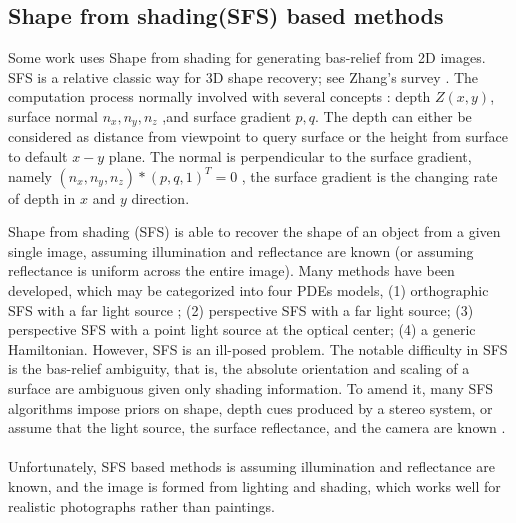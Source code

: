 \subsection{Shape from shading(SFS) based methods}
Some work uses Shape from shading for generating  bas-relief from 2D images. SFS is a relative classic way for 3D shape recovery; see Zhang's survey \cite{zhang1999shape}.  The computation process normally involved with several concepts : depth $Z(x,y)$, surface normal $n_x,n_y,n_z$ ,and surface gradient $p,q$. The depth can either be considered as distance from viewpoint to query surface or the height from surface to default $x-y$ plane. The normal is perpendicular to the surface gradient, namely $\left( n_x,n_y,n_z\right) * \left( p, q ,1\right)^T =0  $ , the surface gradient is the changing rate of depth in $x$ and $y$ direction.

Shape from shading (SFS) is able to recover the shape of an object from a given single image, assuming illumination and reflectance are known (or assuming reflectance is uniform across the entire image). Many methods have been developed, which may be categorized into four PDEs models\cite{prados2003perspective}, (1) orthographic SFS with a far light source \cite{lions1993shape}; (2) perspective SFS with a far light source\cite{prados2004unifying}; (3) perspective SFS with a point light source at the optical center\cite{prados2003perspective}; (4) a generic Hamiltonian. However, SFS is an ill-posed problem. The notable difficulty in SFS is the bas-relief ambiguity\cite{belhumeur1999bas}, that is, the absolute orientation and scaling of a surface are ambiguous given only shading information. To amend it, many SFS algorithms impose priors on shape, depth cues produced by a stereo system, or assume that the light source, the surface reflectance, and the camera are known\cite{zhang1999shape} \cite{alldrin2007resolving} \cite{johnson2011shape} \cite{barron2012color}.\\ \\
Unfortunately, SFS based methods is assuming illumination and reflectance are known, and the image is formed from lighting and shading, which works well for realistic photographs rather than paintings. 

